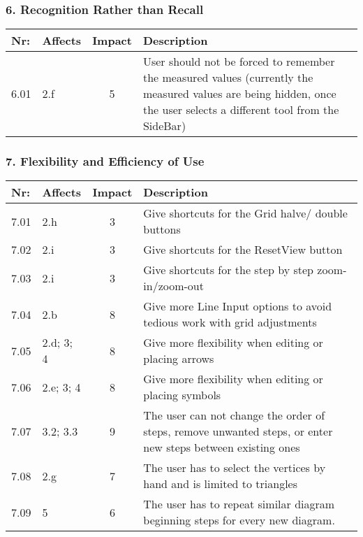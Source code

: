 \subsubsection*{6. Recognition Rather than Recall}

        \begin{tabular}{l | p{} | c | p{}}
        Nr: & Affects & Impact & Description \\ \hline
        6.01 & 2.f  & 5 & User should not be forced to remember the measured values (currently the measured values are being hidden, once the user selects a different tool from the SideBar)\\ \hline 
        \end{tabular}


\subsubsection*{7. Flexibility and Efficiency of Use}
        \begin{tabular}{l | p{} | c | p{}}
        Nr: & Affects & Impact & Description \\ \hline
        7.01 & 2.h & 3 & Give shortcuts for the Grid halve/ double buttons\\ \hline
        7.02 & 2.i  & 3 & Give shortcuts for the ResetView button\\ \hline
        7.03 & 2.i & 3 & Give shortcuts for the step by step zoom-in/zoom-out\\ \hline
        7.04 & 2.b & 8 & Give more Line Input options to avoid tedious work with grid adjustments\\ \hline
        7.05 & 2.d; 3; 4 & 8 & Give more flexibility when editing or placing arrows\\ \hline
        7.06 & 2.e; 3; 4 & 8 & Give more flexibility when editing or placing symbols\\ \hline
        7.07 & 3.2; 3.3 & 9 & The user can not change the order of steps, remove unwanted steps, or enter new steps between existing ones\\ \hline
        7.08 & 2.g & 7 & The user has to select the vertices by hand and is limited to triangles\\ \hline
        7.09 & 5 & 6 & The user has to repeat similar diagram beginning steps for every new diagram.\\ \hline
        \end{tabular}

